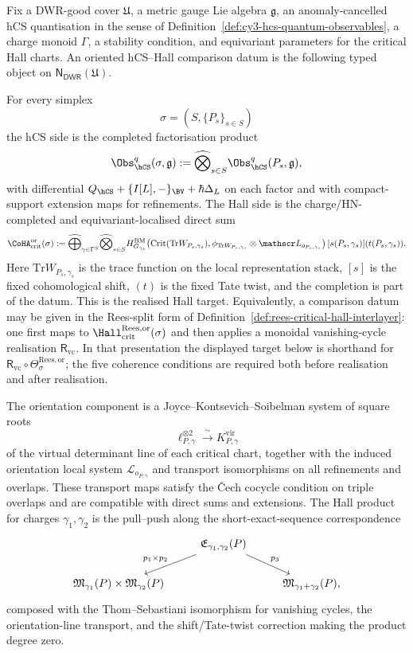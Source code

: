\begin{definition}
\label{def:cy3-oriented-hcs-hall-comparison-datum}
Fix a DWR-good cover $\mathfrak U$, a metric gauge Lie algebra
$\mathfrak g$, an anomaly-cancelled hCS quantisation in the sense of
Definition~\ref{def:cy3-hcs-quantum-observables}, a charge monoid
$\Gamma$, a stability condition, and equivariant parameters for the
critical Hall charts. An oriented hCS--Hall comparison datum is the
following typed object on $\mathsf{N}_{\mathsf{DW\!R}}(\mathfrak U)$.

For every simplex
\[
 \sigma=(S,\{P_s\}_{s\in S})
\]
the hCS side is the completed factorisation product
\[
 \Obs_{\hCS}^{q}(\sigma,\mathfrak g)
 :=
 \widehat{\bigotimes}_{s\in S}
 \Obs_{\hCS}^{q}(P_s,\mathfrak g),
\]
with differential
$Q_{\hCS}+\{I[L],-\}_{\BV}+\hbar\Delta_L$ on each factor and with
compact-support extension maps for refinements. The Hall side is the
charge/HN-completed and equivariant-localised direct sum
\[
 \CoHA_{\mathrm{crit}}^{\mathrm{or}}(\sigma)
 :=
 \widehat{\bigoplus}_{\gamma\in\Gamma^S}
 \widehat{\bigotimes}_{s\in S}
 H^{\mathrm{BM}}_{G_{\gamma_s}}
 \!\left(
 \mathrm{Crit}(\mathrm{Tr}W_{P_s,\gamma_s}),
 \phi_{\mathrm{Tr}W_{P_s,\gamma_s}}\otimes
 \mathscr L_{o_{P_s,\gamma_s}}
 \right)
 [s(P_s,\gamma_s)](t(P_s,\gamma_s)).
\]
Here $\mathrm{Tr}W_{P_s,\gamma_s}$ is the trace function on the local
representation stack, $[s]$ is the fixed cohomological shift, $(t)$ is
the fixed Tate twist, and the completion is part of the datum.
This is the realised Hall target. Equivalently, a comparison datum may be
given in the Rees-split form of
Definition~\ref{def:rees-critical-hall-interlayer}: one first maps to
$\Hall_{\mathrm{crit}}^{\mathrm{Rees},\mathrm{or}}(\sigma)$ and then
applies a monoidal vanishing-cycle realisation
$\mathsf R_{\mathrm{vc}}$. In that presentation the displayed target
below is shorthand for
$\mathsf R_{\mathrm{vc}}\circ
\Theta_{\sigma}^{\mathrm{Rees},\mathrm{or}}$; the five coherence
conditions are required both before realisation and after realisation.

The orientation component is a Joyce--Kontsevich--Soibelman system of
square roots
\[
 \ell_{P,\gamma}^{\otimes 2}
 \xrightarrow{\;\sim\;}
 K^{\mathrm{vir}}_{P,\gamma}
\]
of the virtual determinant line of each critical chart, together with
the induced orientation local system $\mathscr L_{o_{P,\gamma}}$ and
transport isomorphisms on all refinements and overlaps. These
transport maps satisfy the \v{C}ech cocycle condition on triple
overlaps and are compatible with direct sums and extensions. The Hall
product for charges $\gamma_1,\gamma_2$ is the pull--push along the
short-exact-sequence correspondence
\[
\begin{tikzcd}
& \mathfrak E_{\gamma_1,\gamma_2}(P)
 \arrow[dl, "p_1\times p_2"']
 \arrow[dr, "p_3"] & \\
\mathfrak M_{\gamma_1}(P)\times\mathfrak M_{\gamma_2}(P)
&&
\mathfrak M_{\gamma_1+\gamma_2}(P),
\end{tikzcd}
\]
composed with the Thom--Sebastiani isomorphism for vanishing cycles,
the orientation-line transport, and the shift/Tate-twist correction
making the product degree zero.


\end{definition}

